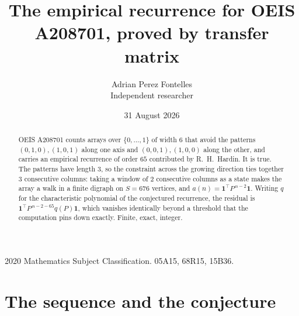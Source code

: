 \documentclass[11pt,a4paper]{article}
\title{The empirical recurrence for OEIS A208701, proved by transfer matrix}
\author{Adrian Perez Fontelles\\ \small Independent researcher}
\date{31 August 2026}
\theoremstyle{plain}
\theoremstyle{definition}
\begin{document}
\maketitle

\begin{abstract}
OEIS A208701 counts arrays over $\{0,\dots,1\}$ of width $6$ that avoid the patterns
$(0,1,0), (1,0,1)$ along one axis and $(0,0,1), (1,0,0)$ along the other, and carries an empirical recurrence of
order $65$ contributed by R.~H.~Hardin. It is true. The patterns have length $3$, so
the constraint across the growing direction ties together $3$ consecutive columns: taking a
window of $2$ consecutive columns as a state makes the array a walk in a finite digraph
on $S=676$ vertices, and $a(n)=\mathbf{1}^{\!\top}P^{\,n-2}\mathbf{1}$. Writing $q$
for the characteristic polynomial of the conjectured recurrence, the residual is
$\mathbf{1}^{\!\top}P^{\,n-2-65}q(P)\mathbf{1}$, which vanishes identically
beyond a threshold that the computation pins down exactly. Finite, exact, integer.
\end{abstract}

\noindent\small 2020 Mathematics Subject Classification. 05A15, 68R15, 15B36.\normalsize

\section{The sequence and the conjecture}
\end{document}
